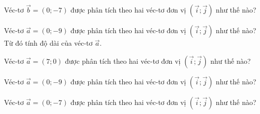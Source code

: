 \begin{bt}%
	Véc-tơ $\overrightarrow{b}=(0;-7)$ được phân tích theo hai véc-tơ đơn vị $\left(\overrightarrow{i};\overrightarrow{j}\right)$ như thế nào?
\end{bt}

\begin{bt}%
	Véc-tơ $\overrightarrow{a}=(0;-9)$ được phân tích theo hai véc-tơ đơn vị $\left(\overrightarrow{i};\overrightarrow{j}\right)$ như thế nào? Từ đó tính độ dài của véc-tơ $\overrightarrow{a}$.
\end{bt}

\begin{bt}%
	Véc-tơ $\overrightarrow{a}=(7;0)$ được phân tích theo hai véc-tơ đơn vị $\left(\overrightarrow{i};\overrightarrow{j}\right)$ như thế nào?
\end{bt}

\begin{bt}%
	Véc-tơ $\overrightarrow{a}=(0;-9)$ được phân tích theo hai véc-tơ đơn vị $\left(\overrightarrow{i};\overrightarrow{j}\right)$ như thế nào?
\end{bt}

\begin{bt}%
	Véc-tơ $\overrightarrow{a}=(0;-7)$ được phân tích theo hai véc-tơ đơn vị $\left(\overrightarrow{i};\overrightarrow{j}\right)$ như thế nào?
\end{bt}

